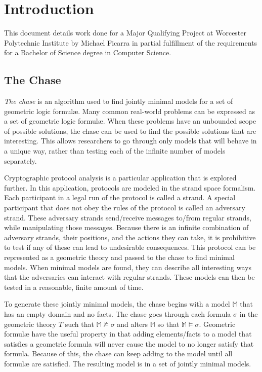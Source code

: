 \section{Introduction}

	This document details work done for a Major Qualifying Project at Worcester
	Polytechnic Institute by Michael Ficarra in partial fulfillment of the
	requirements for a Bachelor of Science degree in Computer Science.

	\subsection{The Chase}

		\emph{The chase} is an algorithm used to find jointly minimal models
		for a set of geometric logic formul{\ae}. Many common real-world
		problems can be expressed as a set of geometric logic formul{\ae}. When
		these problems have an unbounded scope of possible solutions, the chase
		can be used to find the possible solutions that are interesting. This
		allows researchers to go through only models that will behave in a
		unique way, rather than testing each of the infinite number of models
		separately.

		Cryptographic protocol analysis is a particular application that is
		explored further. In this application, protocols are modeled in the
		strand space formalism. Each participant in a legal run of the
		protocol is called a strand. A special participant that does not obey
		the rules of the protocol is called an adversary strand. These
		adversary strands send/receive messages to/from regular strands, while
		manipulating those messages. Because there is an infinite combination
		of adversary strands, their positions, and the actions they can take,
		it is prohibitive to test if any of these can lead to undesirable
		consequences. This protocol can be represented as a geometric theory
		and passed to the chase to find minimal models. When minimal models
		are found, they can describe all interesting ways that the adversaries
		can interact with regular strands. These models can then be tested in
		a reasonable, finite amount of time.

		To generate these jointly minimal models, the chase begins with a model
		$\mathbb{M}$ that has an empty domain and no facts. The chase goes
		through each formula $\sigma$ in the geometric theory $T$ such that
		$\mathbb{M} \not\models \sigma$ and alters $\mathbb{M}$ so that
		$\mathbb{M} \models \sigma$. Geometric formul{\ae} have the useful
		property in that adding elements/facts to a model that satisfies a
		geometric formula will never cause the model to no longer satisfy that
		formula.  Because of this, the chase can keep adding to the model until
		all formul{\ae} are satisfied. The resulting model is in a set of
		jointly minimal models.

